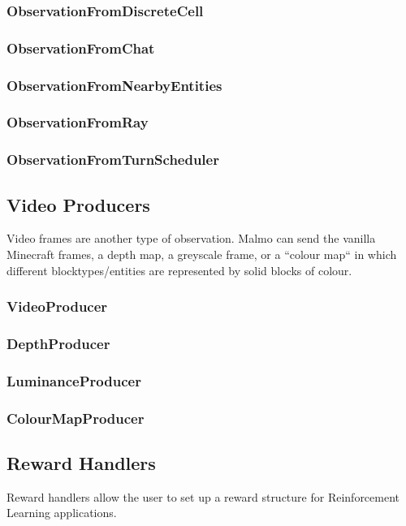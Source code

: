 \documentclass[11pt]{article} %
\begin{document}
\subsubsection{ObservationFromDiscreteCell}
\subsubsection{ObservationFromChat}
\subsubsection{ObservationFromNearbyEntities}
\subsubsection{ObservationFromRay}
\subsubsection{ObservationFromTurnScheduler}

\subsection{Video Producers}
Video frames are another type of observation. Malmo can send the vanilla Minecraft frames, a depth map, a greyscale frame, or a ``colour map`` in which different blocktypes/entities are represented by solid blocks of colour.

\subsubsection{VideoProducer}
\subsubsection{DepthProducer}
\subsubsection{LuminanceProducer}
\subsubsection{ColourMapProducer}

\subsection{Reward Handlers}
Reward handlers allow the user to set up a reward structure for Reinforcement Learning applications.
\end{document}
